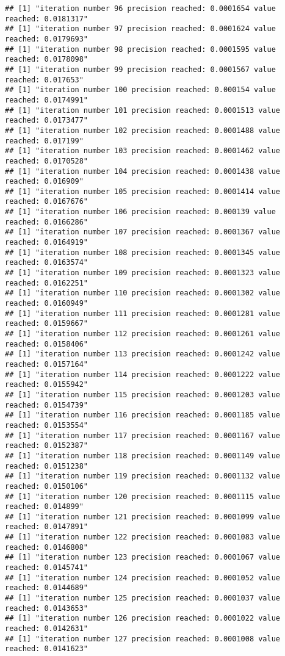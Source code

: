 \documentclass[
]{article}
\begin{document}
\begin{verbatim}
## [1] "iteration number 96 precision reached: 0.0001654 value reached: 0.0181317"
## [1] "iteration number 97 precision reached: 0.0001624 value reached: 0.0179693"
## [1] "iteration number 98 precision reached: 0.0001595 value reached: 0.0178098"
## [1] "iteration number 99 precision reached: 0.0001567 value reached: 0.017653"
## [1] "iteration number 100 precision reached: 0.000154 value reached: 0.0174991"
## [1] "iteration number 101 precision reached: 0.0001513 value reached: 0.0173477"
## [1] "iteration number 102 precision reached: 0.0001488 value reached: 0.017199"
## [1] "iteration number 103 precision reached: 0.0001462 value reached: 0.0170528"
## [1] "iteration number 104 precision reached: 0.0001438 value reached: 0.016909"
## [1] "iteration number 105 precision reached: 0.0001414 value reached: 0.0167676"
## [1] "iteration number 106 precision reached: 0.000139 value reached: 0.0166286"
## [1] "iteration number 107 precision reached: 0.0001367 value reached: 0.0164919"
## [1] "iteration number 108 precision reached: 0.0001345 value reached: 0.0163574"
## [1] "iteration number 109 precision reached: 0.0001323 value reached: 0.0162251"
## [1] "iteration number 110 precision reached: 0.0001302 value reached: 0.0160949"
## [1] "iteration number 111 precision reached: 0.0001281 value reached: 0.0159667"
## [1] "iteration number 112 precision reached: 0.0001261 value reached: 0.0158406"
## [1] "iteration number 113 precision reached: 0.0001242 value reached: 0.0157164"
## [1] "iteration number 114 precision reached: 0.0001222 value reached: 0.0155942"
## [1] "iteration number 115 precision reached: 0.0001203 value reached: 0.0154739"
## [1] "iteration number 116 precision reached: 0.0001185 value reached: 0.0153554"
## [1] "iteration number 117 precision reached: 0.0001167 value reached: 0.0152387"
## [1] "iteration number 118 precision reached: 0.0001149 value reached: 0.0151238"
## [1] "iteration number 119 precision reached: 0.0001132 value reached: 0.0150106"
## [1] "iteration number 120 precision reached: 0.0001115 value reached: 0.014899"
## [1] "iteration number 121 precision reached: 0.0001099 value reached: 0.0147891"
## [1] "iteration number 122 precision reached: 0.0001083 value reached: 0.0146808"
## [1] "iteration number 123 precision reached: 0.0001067 value reached: 0.0145741"
## [1] "iteration number 124 precision reached: 0.0001052 value reached: 0.0144689"
## [1] "iteration number 125 precision reached: 0.0001037 value reached: 0.0143653"
## [1] "iteration number 126 precision reached: 0.0001022 value reached: 0.0142631"
## [1] "iteration number 127 precision reached: 0.0001008 value reached: 0.0141623"
\end{verbatim}
\end{document}
